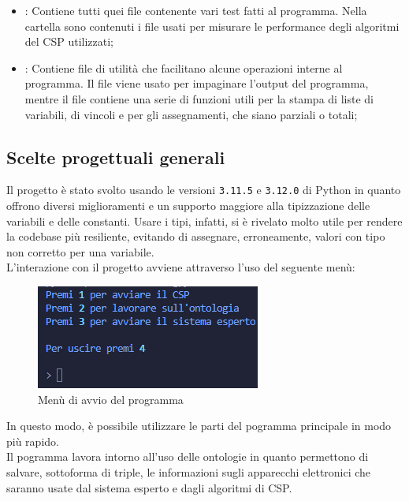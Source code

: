 \documentclass[12pt, letterpaper]{article}
\begin{document}
\begin{itemize}
      \item {}: Contiene tutti quei file contenente vari test fatti al programma.
            Nella cartella  sono contenuti i file usati per misurare le
            performance degli algoritmi del CSP utilizzati;

      \item {}: Contiene file di utilità che facilitano alcune operazioni interne al programma.
            Il file  viene usato per impaginare l'output del programma, mentre il file
             contiene una serie di funzioni utili per la stampa di liste di variabili, di vincoli
            e per gli assegnamenti, che siano parziali o totali;
\end{itemize}

\subsection{Scelte progettuali generali}

Il progetto è stato svolto usando le versioni \texttt{3.11.5} e \texttt{3.12.0} di Python in quanto offrono diversi
miglioramenti e un supporto maggiore alla tipizzazione delle variabili e delle constanti.
Usare i tipi, infatti, si è rivelato molto utile per rendere la codebase più resiliente, evitando di
assegnare, erroneamente, valori con tipo non corretto per una variabile. \\

\noindent L'interazione con il progetto avviene attraverso l'uso del seguente menù:

\begin{figure}[h]
      \centering
      \includegraphics{menu-iniziale.png}
      \caption{Menù di avvio del programma}
\end{figure}

\noindent In questo modo, è possibile utilizzare le parti del pogramma principale in modo più rapido. \\

\noindent Il pogramma lavora intorno all'uso delle ontologie in quanto permettono di salvare, sottoforma di triple,
le informazioni sugli apparecchi elettronici che saranno usate dal sistema esperto e dagli algoritmi di CSP.
\end{document}
